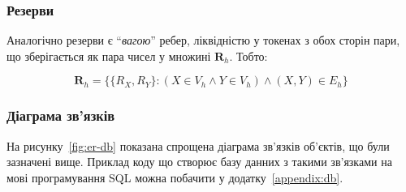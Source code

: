 \documentclass[../index.tex]{subfiles}
\begin{document}
\subsubsection{Резерви}

Аналогічно резерви є ``\textit{вагою}'' ребер, ліквідністю у токенах з обох сторін пари, що
зберігається як пара чисел у множині $\mathbf{R}_{h}$. Тобто:

\begin{equation*}
\mathbf{R}_{h} = \{ \{R_{X}, R_{Y}\}: (X \in V_{h} \land Y \in V_{h}) \land (X, Y) \in E_{h} \}
\end{equation*}

\subsubsection{Діаграма зв'язків}

На рисунку~\ref{fig:er-db} показана спрощена діаграма зв'язків об'єктів, що були
зазначені вище. Приклад коду що створює базу данних з такими зв'язками на мові
програмування SQL можна побачити у додатку~\ref{appendix:db}.
\end{document}
